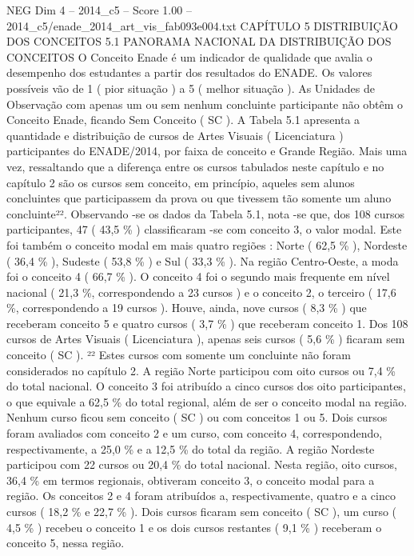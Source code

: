 \begin{textsample}{NEG Dim 4 – 2014\_c5 – Score 1.00 – 2014\_c5/enade\_2014\_art\_vis\_fab093e004.txt}  \label{ex:f4_neg_204}
CAPÍTULO 5 DISTRIBUIÇÃO DOS CONCEITOS 5.1 PANORAMA NACIONAL DA DISTRIBUIÇÃO DOS CONCEITOS O Conceito Enade é um indicador de qualidade que avalia o desempenho dos estudantes a partir dos resultados do ENADE.
Os valores possíveis vão de 1 ( pior situação ) a 5 ( melhor situação ).
As Unidades de Observação com apenas um ou sem nenhum concluinte participante não obtêm o Conceito Enade, ficando Sem Conceito ( SC ).
A Tabela 5.1 apresenta a quantidade e distribuição de cursos de Artes Visuais ( Licenciatura ) participantes do ENADE/2014, por faixa de conceito e Grande Região.
Mais uma vez, ressaltando que a diferença entre os cursos tabulados neste capítulo e no capítulo 2 são os cursos sem conceito, em princípio, aqueles sem alunos concluintes que participassem da prova ou que tivessem tão somente um aluno concluinte²².
Observando -se os dados da Tabela 5.1, nota -se que, dos 108 cursos participantes, 47 ( 43,5 \% ) classificaram -se com conceito 3, o valor modal.
Este foi também o conceito modal em mais quatro regiões : Norte ( 62,5 \% ), Nordeste ( 36,4 \% ), Sudeste ( 53,8 \% ) e Sul ( 33,3 \% ).
Na região Centro-Oeste, a moda foi o conceito 4 ( 66,7 \% ).
O conceito 4 foi o segundo mais frequente em nível nacional ( 21,3 \%, correspondendo a 23 cursos ) e o conceito 2, o terceiro ( 17,6 \%, correspondendo a 19 cursos ).
Houve, ainda, nove cursos ( 8,3 \% ) que receberam conceito 5 e quatro cursos ( 3,7 \% ) que receberam conceito 1.
Dos 108 cursos de Artes Visuais ( Licenciatura ), apenas seis cursos ( 5,6 \% ) ficaram sem conceito ( SC ). ²² Estes cursos com somente um concluinte não foram considerados no capítulo 2.
A região Norte participou com oito cursos ou 7,4 \% do total nacional.
O conceito 3 foi atribuído a cinco cursos dos oito participantes, o que equivale a 62,5 \% do total regional, além de ser o conceito modal na região.
Nenhum curso ficou sem conceito ( SC ) ou com conceitos 1 ou 5.
Dois cursos foram avaliados com conceito 2 e um curso, com conceito 4, correspondendo, respectivamente, a 25,0 \% e a 12,5 \% do total da região.
A região Nordeste participou com 22 cursos ou 20,4 \% do total nacional.
Nesta região, oito cursos, 36,4 \% em termos regionais, obtiveram conceito 3, o conceito modal para a região.
Os conceitos 2 e 4 foram atribuídos a, respectivamente, quatro e a cinco cursos ( 18,2 \% e 22,7 \% ).
Dois cursos ficaram sem conceito ( SC ), um curso ( 4,5 \% ) recebeu o conceito 1 e os dois cursos restantes ( 9,1 \% ) receberam o conceito 5, nessa região.

\end{textsample}
